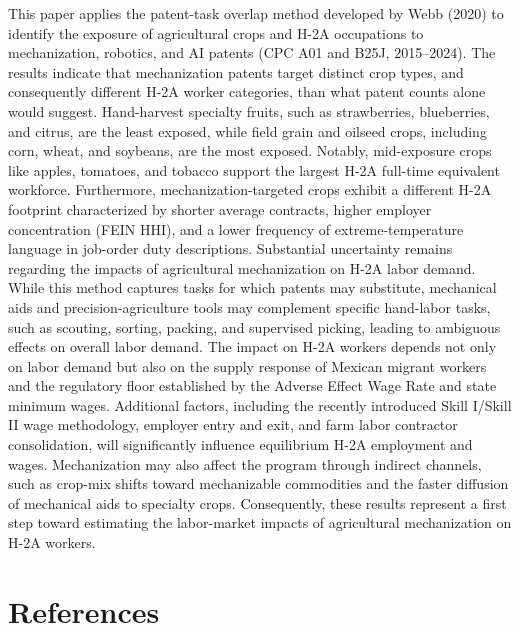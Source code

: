 \documentclass[11pt]{article}
\begin{document}
This paper applies the patent-task overlap method developed by Webb (2020) to identify the exposure of agricultural crops and H-2A occupations to mechanization, robotics, and AI patents (CPC A01 and B25J, 2015–2024). The results indicate that mechanization patents target distinct crop types, and consequently different H-2A worker categories, than what patent counts alone would suggest. Hand-harvest specialty fruits, such as strawberries, blueberries, and citrus, are the least exposed, while field grain and oilseed crops, including corn, wheat, and soybeans, are the most exposed. Notably, mid-exposure crops like apples, tomatoes, and tobacco support the largest H-2A full-time equivalent workforce. Furthermore, mechanization-targeted crops exhibit a different H-2A footprint characterized by shorter average contracts, higher employer concentration (FEIN HHI), and a lower frequency of extreme-temperature language in job-order duty descriptions.
Substantial uncertainty remains regarding the impacts of agricultural mechanization on H-2A labor demand. While this method captures tasks for which patents may substitute, mechanical aids and precision-agriculture tools may complement specific hand-labor tasks, such as scouting, sorting, packing, and supervised picking, leading to ambiguous effects on overall labor demand. The impact on H-2A workers depends not only on labor demand but also on the supply response of Mexican migrant workers and the regulatory floor established by the Adverse Effect Wage Rate and state minimum wages. Additional factors, including the recently introduced Skill I/Skill II wage methodology, employer entry and exit, and farm labor contractor consolidation, will significantly influence equilibrium H-2A employment and wages. Mechanization may also affect the program through indirect channels, such as crop-mix shifts toward mechanizable commodities and the faster diffusion of mechanical aids to specialty crops. Consequently, these results represent a first step toward estimating the labor-market impacts of agricultural mechanization on H-2A workers.





\section*{References}
\end{document}
